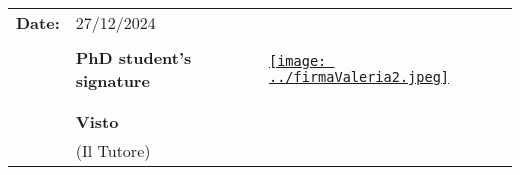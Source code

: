 \documentclass[12pt,a4paper,oneside]{extarticle}
\begin{document}
\begin{tabular}{p{3cm} p{7cm} p{3cm}}
    \textbf{Date:} &\hspace{-2cm} 27/12/2024 & \\
    &  &\\
    & \hspace{1cm} \vspace{-3mm} \textbf{PhD student's signature} &\underline{\texttt{[image: ../firmaValeria2.jpeg]}}\\
    & &\\
    & &\\
    & \hspace{4.5cm} \textbf{Visto} & \vspace{-6mm} \hspace{1cm} \underline{\hspace{6.2cm}} \\
    & \hspace{4.1cm} \vspace{-1cm}(Il Tutore)  &\\
\end{tabular}






\end{document}
